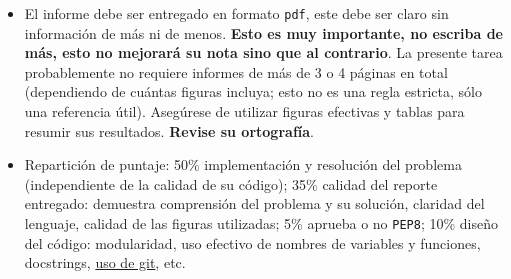 \documentclass[letter, 11pt]{article}
\begin{document}
\begin{itemize}
  \item El informe debe ser entregado en formato \texttt{pdf}, este debe ser
    claro sin información de más ni de menos. \textbf{Esto es muy importante,
    no escriba de más, esto no mejorará su nota sino que al contrario}. La
    presente tarea probablemente no requiere informes de más de 3 o 4 páginas
    en total (dependiendo de cuántas figuras incluya; esto no es una regla
    estricta, sólo una referencia útil).  Asegúrese de utilizar figuras
    efectivas y tablas para resumir sus resultados. \textbf{Revise su
    ortografía}.

   \item Repartición de puntaje: 50\% implementación y resolución del problema
     (independiente de la calidad de su código); 35\% calidad del reporte
     entregado: demuestra comprensión del problema y su solución, claridad del
     lenguaje, calidad de las figuras utilizadas; 5\% aprueba o no
     \texttt{PEP8}; 10\% diseño del código: modularidad, uso efectivo de
     nombres de variables y funciones, docstrings, \underline{uso de git}, etc.

\end{itemize}
\end{document}
